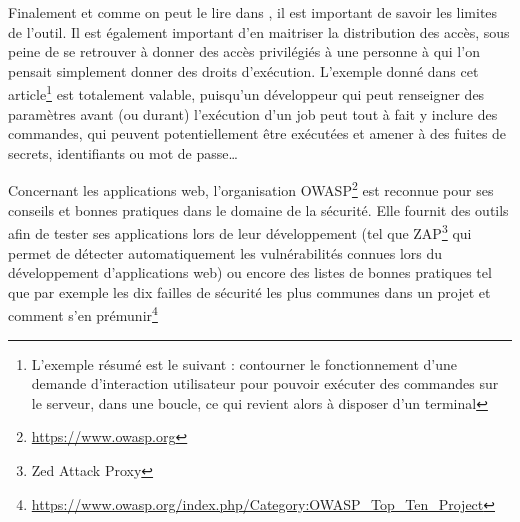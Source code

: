 Finalement et comme on peut le lire dans  \cite{jenkins-security}, il est important de savoir les limites de l'outil. Il est également important d'en maitriser la distribution des accès, sous peine de se retrouver à donner des accès privilégiés à une personne à qui l'on pensait simplement donner des droits d'exécution. L'exemple donné dans cet article\footnote{L'exemple résumé est le suivant : contourner le fonctionnement d'une demande d'interaction utilisateur pour pouvoir exécuter des commandes sur le serveur, dans une boucle, ce qui revient alors à disposer d'un terminal} est totalement valable, puisqu'un développeur qui peut renseigner des paramètres avant (ou durant) l'exécution d'un job peut tout à fait y inclure des commandes, qui peuvent potentiellement être exécutées et amener à des fuites de secrets, identifiants ou mot de passe\ldots{} 

Concernant les applications web, l'organisation \gls{OWASP}\footnote{\url{https://www.owasp.org}} est reconnue pour ses conseils et bonnes pratiques dans le domaine de la sécurité. Elle fournit des outils afin de tester ses applications lors de leur développement (tel que ZAP\footnote{Zed Attack Proxy} qui permet de détecter automatiquement les vulnérabilités connues lors du développement d'applications web) ou encore des listes de bonnes pratiques tel que par exemple les dix failles de sécurité les plus communes dans un projet et comment s'en prémunir\footnote{\url{https://www.owasp.org/index.php/Category:OWASP_Top_Ten_Project}}
